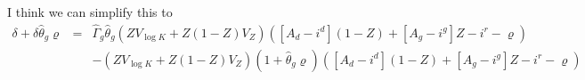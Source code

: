 \documentclass[12pt]{article}
\begin{document}
\begin{appendices}
 I think we can simplify this to 
\begin{eqnarray*}
\delta + \delta \hat{\theta}_g \varrho & = & \hat{\Gamma}_g \hat{\theta}_g  \left( Z V_{\log K} + Z (1-Z) V_{Z} \right) ([A_{d}-i^{d}](1-Z)+[A_{g}-i^{g}]Z -i^{r} - \varrho) \\
& & - \left( Z V_{\log K} + Z (1-Z) V_{Z} \right) ( 1 + \hat{\theta}_g \varrho) ([A_{d}-i^{d}](1-Z)+[A_{g}-i^{g}]Z -i^{r} - \varrho)
\end{eqnarray*}


\end{appendices}
\end{document}
